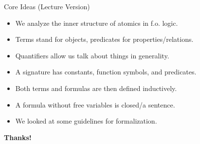 \begin{frame}{Core Ideas (Lecture Version)}

	\begin{itemize}%
	\itemsep=16pt
	
		\item We analyze the inner structure of atomics in f.o. logic.
		
		\item  Terms stand for objects, predicates for properties/relations.
		
		\item Quantifiers allow us talk about things in generality.
		
		\item A signature has constants, function symbols, and predicates.
		
		\item Both terms and formulas are then defined inductively.
		
		\item A formula without free variables is closed/a sentence.
		
		\item We looked at some guidelines for formalization.
					
	\end{itemize}

\end{frame}


\begin{frame}

	\begin{center}
	{\huge\bf Thanks!}
	\end{center}

\end{frame}
